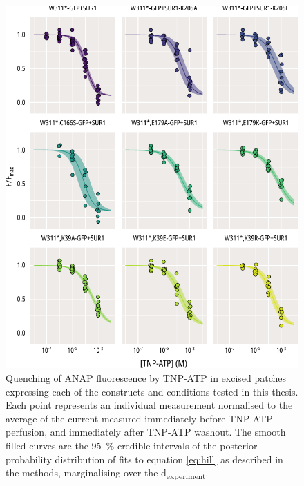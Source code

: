 \begin{figure}[h]
	\centering
	\includegraphics[width=\textwidth]{all_pcf_fits_3.pdf}
	\caption[Excised patch quenching population hill fits]{
	{\bf{}}
	Quenching of ANAP fluorescence by TNP-ATP in excised patches expressing each of the constructs and conditions tested in this thesis.
	Each point represents an individual measurement normalised to the average of the current measured immediately before TNP-ATP perfusion, and immediately after TNP-ATP washout.
	The smooth filled curves are the \SI{95}{\percent} credible intervals of the posterior probability distribution of fits to equation \ref{eq:hill} as described in the methods, marginalising over the \textgreek{d}\textsubscript{experiment}.
	}
	\label{apxfig:pcf_1}
\end{figure}

